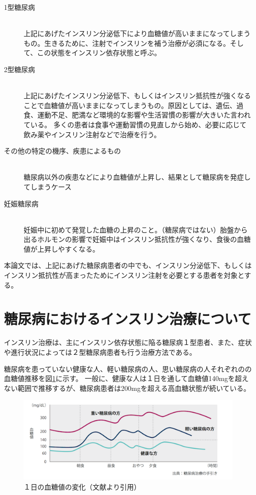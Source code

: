 \begin{description}
  \item [1型糖尿病]\mbox{}\\
    上記にあげたインスリン分泌低下により血糖値が高いままになってしまうもの。生きるために、注射でインスリンを補う治療が必須になる。そして、この状態をインスリン依存状態と呼ぶ。
  \item [2型糖尿病]\mbox{}\\
    上記にあげたインスリン分泌低下、もしくはインスリン抵抗性が強くなることで血糖値が高いままになってしまうもの。原因としては、遺伝、過食、運動不足、肥満など環境的な影響や生活習慣の影響が大きいた言われている。
    多くの患者は食事や運動習慣の見直しから始め、必要に応じて飲み薬やインスリン注射などで治療を行う。
  \item [その他の特定の機序、疾患によるもの]\mbox{}\\
    糖尿病以外の疾患などにより血糖値が上昇し、結果として糖尿病を発症してしまうケース
  \item [妊娠糖尿病]\mbox{}\\
    妊娠中に初めて発覚した血糖の上昇のこと。（糖尿病ではない）胎盤から出るホルモンの影響で妊娠中はインスリン抵抗性が強くなり、食後の血糖値が上昇しやすくなる。
\end{description}

本論文では、上記にあげた糖尿病患者の中でも、インスリン分泌低下、もしくはインスリン抵抗性が高まったためにインスリン注射を必要とする患者を対象とする。

\section{糖尿病におけるインスリン治療について}
\label{subsubsection:insulin_treatment}

インスリン治療は、主にインスリン依存状態に陥る糖尿病１型患者、また、症状や進行状況によっては２型糖尿病患者も行う治療方法である。\cite{insulin_treatment_method}

糖尿病を患っていない健康な人、軽い糖尿病の人、思い糖尿病の人それぞれのの血糖値推移を図\ref{fig:suger_in_blood_change}に示す。
一般に、健康な人は１日を通して血糖値140mgを超えない範囲で推移するが、糖尿病患者は200mgを超える高血糖状態が続いている。

\begin{figure}[htbp]
  \caption{１日の血糖値の変化（文献\cite{suger_in_blood_change}より引用）}
  \label{fig:suger_in_blood_change}
  \begin{center}
    \includegraphics[bb=0 0 500 200,width=15cm]{assets/suger_in_blood_change.png}
  \end{center}
\end{figure}

